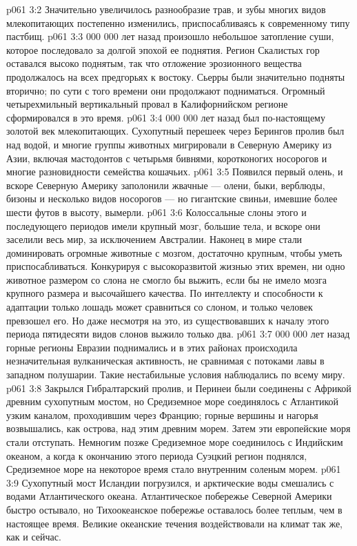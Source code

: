 \vs p061 3:2 Значительно увеличилось разнообразие трав, и зубы многих видов млекопитающих постепенно изменились, приспосабливаясь к современному типу пастбищ.
\vs p061 3:3  000 000 лет назад произошло небольшое затопление суши, которое последовало за долгой эпохой ее поднятия. Регион Скалистых гор оставался высоко поднятым, так что отложение эрозионного вещества продолжалось на всех предгорьях к востоку. Сьерры были значительно подняты вторично; по сути с того времени они продолжают подниматься. Огромный четырехмильный вертикальный провал в Калифорнийском регионе сформировался в это время.
\vs p061 3:4  000 000 лет назад был по\hyp{}настоящему золотой век млекопитающих. Сухопутный перешеек через Берингов пролив был над водой, и многие группы животных мигрировали в Северную Америку из Азии, включая мастодонтов с четырьмя бивнями, коротконогих носорогов и многие разновидности семейства кошачьих.
\vs p061 3:5 Появился первый олень, и вскоре Северную Америку заполонили жвачные --- олени, быки, верблюды, бизоны и несколько видов носорогов --- но гигантские свиньи, имевшие более шести футов в высоту, вымерли.
\vs p061 3:6 Колоссальные слоны этого и последующего периодов имели крупный мозг, большие тела, и вскоре они заселили весь мир, за исключением Австралии. Наконец в мире стали доминировать огромные животные с мозгом, достаточно крупным, чтобы уметь приспосабливаться. Конкурируя с высокоразвитой жизнью этих времен, ни одно животное размером со слона не смогло бы выжить, если бы не имело мозга крупного размера и высочайшего качества. По интеллекту и способности к адаптации только лошадь может сравниться со слоном, и только человек превзошел его. Но даже несмотря на это, из существовавших к началу этого периода пятидесяти видов слонов выжило только два.
\vs p061 3:7  000 000 лет назад горные регионы Евразии поднимались и в этих районах происходила незначительная вулканическая активность, не сравнимая с потоками лавы в западном полушарии. Такие нестабильные условия наблюдались по всему миру.
\vs p061 3:8 Закрылся Гибралтарский пролив, и Перинеи были соединены с Африкой древним сухопутным мостом, но Средиземное море соединялось с Атлантикой узким каналом, проходившим через Францию; горные вершины и нагорья возвышались, как острова, над этим древним морем. Затем эти европейские моря стали отступать. Немногим позже Средиземное море соединилось с Индийским океаном, а когда к окончанию этого периода Суэцкий регион поднялся, Средиземное море на некоторое время стало внутренним соленым морем.
\vs p061 3:9 Сухопутный мост Исландии погрузился, и арктические воды смешались с водами Атлантического океана. Атлантическое побережье Северной Америки быстро остывало, но Тихоокеанское побережье оставалось более теплым, чем в настоящее время. Великие океанские течения воздействовали на климат так же, как и сейчас.

